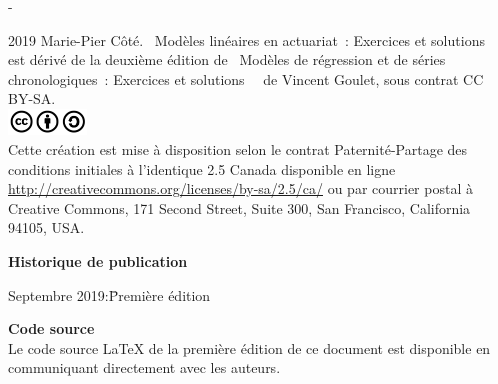\begingroup
\calccentering{\unitlength}
\begin{adjustwidth*}{\unitlength}{-\unitlength}
  \small
  \setlength{\parindent}{0pt}
  \setlength{\parskip}{\baselineskip}

  {\textcopyright} 2019 Marie-Pier Côté. \og~Modèles linéaires en actuariat~: Exercices et solutions~\fg~ est dérivé de la deuxième édition de \og~Modèles de régression et de séries chronologiques~: Exercices et solutions~\fg~ de Vincent Goulet, sous contrat CC BY-SA. \\
  

  \includegraphics[height=7mm,keepaspectratio=true]{cc-by-sa.jpg} \\  
  Cette création est mise à disposition selon le contrat
  Paternité-Partage des conditions initiales à l'identique 2.5 Canada
  disponible en ligne
  \url{http://creativecommons.org/licenses/by-sa/2.5/ca/} ou par
  courrier postal à Creative Commons, 171 Second Street, Suite 300,
  San Francisco, California 94105, USA.


  \textbf{Historique de publication}
  \vspace{-\baselineskip}
  \begin{tabbing}
    Septembre 2019:\quad\= Première édition 
  \end{tabbing}

  \textbf{Code source} \\
  Le code source {\LaTeX} de la première édition de ce document est disponible en communiquant directement avec les auteurs.

  \vspace{1cm}

\end{adjustwidth*}
\endgroup

\renewcommand{\sfdefault}{phv}

\clearpage

